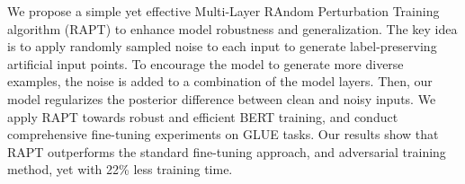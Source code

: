 We propose a simple yet effective Multi-Layer RAndom Perturbation Training algorithm (RAPT) to enhance model robustness and generalization. The key idea is to apply randomly sampled noise to each input to generate label-preserving artificial input points. To encourage the model to generate more diverse examples, the noise is added to a combination of the model layers. Then, our model regularizes the posterior difference between clean and noisy inputs. We apply RAPT  towards robust and efficient BERT training, and conduct comprehensive fine-tuning experiments on GLUE tasks. Our results show that RAPT outperforms the standard fine-tuning approach, and adversarial training method, yet with 22\% less training time.
